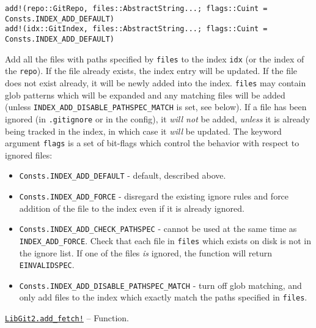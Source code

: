 \begin{adjustwidth}{2em}{0pt}


\begin{verbatim}
add!(repo::GitRepo, files::AbstractString...; flags::Cuint = Consts.INDEX_ADD_DEFAULT)
add!(idx::GitIndex, files::AbstractString...; flags::Cuint = Consts.INDEX_ADD_DEFAULT)
\end{verbatim}

Add all the files with paths specified by \texttt{files} to the index \texttt{idx} (or the index of the \texttt{repo}). If the file already exists, the index entry will be updated. If the file does not exist already, it will be newly added into the index. \texttt{files} may contain glob patterns which will be expanded and any matching files will be added (unless \texttt{INDEX\_ADD\_DISABLE\_PATHSPEC\_MATCH} is set, see below). If a file has been ignored (in \texttt{.gitignore} or in the config), it \emph{will not} be added, \emph{unless} it is already being tracked in the index, in which case it \emph{will} be updated. The keyword argument \texttt{flags} is a set of bit-flags which control the behavior with respect to ignored files:

\begin{itemize}
\item \texttt{Consts.INDEX\_ADD\_DEFAULT} - default, described above.


\item \texttt{Consts.INDEX\_ADD\_FORCE} - disregard the existing ignore rules and force addition of the file to the index even if it is already ignored.


\item \texttt{Consts.INDEX\_ADD\_CHECK\_PATHSPEC} - cannot be used at the same time as \texttt{INDEX\_ADD\_FORCE}. Check that each file in \texttt{files} which exists on disk is not in the ignore list. If one of the files \emph{is} ignored, the function will return \texttt{EINVALIDSPEC}.


\item \texttt{Consts.INDEX\_ADD\_DISABLE\_PATHSPEC\_MATCH} - turn off glob matching, and only add files to the index which exactly match the paths specified in \texttt{files}.

\end{itemize}


\end{adjustwidth}
\hypertarget{6981412809211295791}{}
\hyperlink{6981412809211295791}{\texttt{LibGit2.add\_fetch!}}  -- {Function.}

